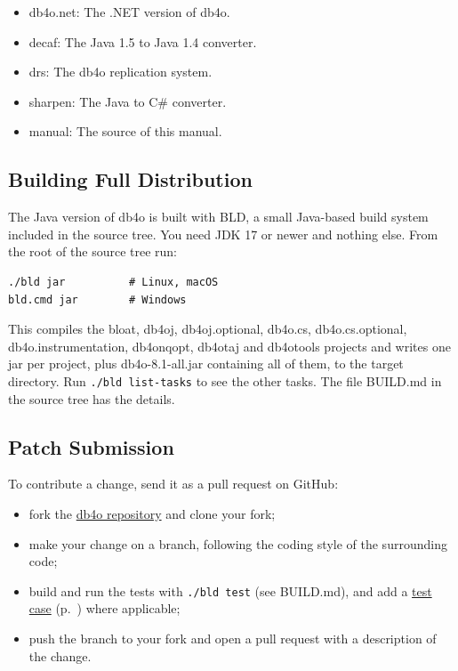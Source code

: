 \begin{itemize}
\item db4o.net: The .NET version of db4o.
\item decaf: The Java 1.5 to Java 1.4 converter.
\item drs: The db4o replication system.
\item sharpen: The Java to C\# converter.
\item manual: The source of this manual.
\end{itemize}

\subsection{Building Full Distribution}
\label{ref:community-working-with-source-building-full-distribution}

The Java version of db4o is built with BLD, a small Java-based build system included in the source tree. You need JDK 17 or newer and nothing else. From the root of the source tree run:

\begin{lstlisting}
./bld jar          # Linux, macOS
bld.cmd jar        # Windows
\end{lstlisting}

This compiles the bloat, db4oj, db4oj.optional, db4o.cs, db4o.cs.optional, db4o.instrumentation, db4onqopt, db4otaj and db4otools projects and writes one jar per project, plus db4o-8.1-all.jar containing all of them, to the target directory. Run \texttt{./bld list-tasks} to see the other tasks. The file BUILD.md in the source tree has the details.

\subsection{Patch Submission}
\label{ref:community-working-with-source-patch-submission}

To contribute a change, send it as a pull request on GitHub:

\begin{itemize}
\item fork the \href{https://github.com/blakemcbride/db4o}{db4o repository} and clone your fork;
\item make your change on a branch, following the coding style of the surrounding code;
\item build and run the tests with \texttt{./bld test} (see BUILD.md), and add a \hyperref[ref:community-working-with-source-db4o-testing-framework]{test case} (p.~\pageref{ref:community-working-with-source-db4o-testing-framework}) where applicable;
\item push the branch to your fork and open a pull request with a description of the change.
\end{itemize}
